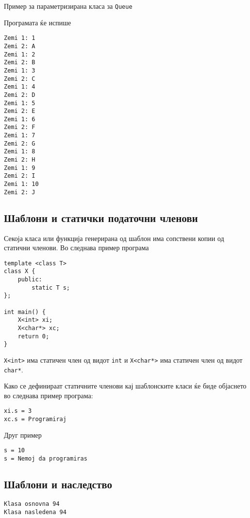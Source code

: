 Пример за параметризирана класа за \texttt{Queue}



Програмата ќе испише
\begin{verbatim}
Zemi 1: 1
Zemi 2: A
Zemi 1: 2
Zemi 2: B
Zemi 1: 3
Zemi 2: C
Zemi 1: 4
Zemi 2: D
Zemi 1: 5
Zemi 2: E
Zemi 1: 6
Zemi 2: F
Zemi 1: 7
Zemi 2: G
Zemi 1: 8
Zemi 2: H
Zemi 1: 9
Zemi 2: I
Zemi 1: 10
Zemi 2: J
\end{verbatim}

\subsection{Шаблони и статички податочни членови}

Секоја класа или функција генерирана од шаблон има сопствени копии од статични
членови.
Во следнава пример програма

\begin{lstlisting}
template <class T>
class X {
    public:
		static T s;
};

int main() {
	X<int> xi;
 	X<char*> xc;
 	return 0;
}
\end{lstlisting}

\texttt{X<int>} има статичен член од видот \texttt{int} и \texttt{X<char*>} има
статичен член од видот \texttt{char*}.

Како се дефинираат статичните членови кај шаблонските класи ќе биде објаснето во
следнава пример програма:




\begin{verbatim}
xi.s = 3
xc.s = Programiraj
\end{verbatim}

Друг пример



\begin{verbatim}
s = 10
s = Nemoj da programiras
\end{verbatim}

\subsection{Шаблони и наследство}



\begin{verbatim}
Klasa osnovna 94
Klasa nasledena 94
\end{verbatim}

